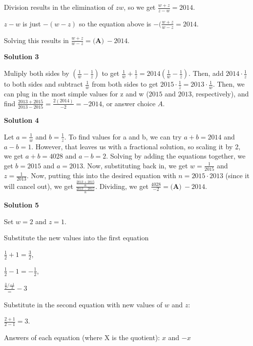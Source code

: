 \begin{enumerate}
 Division results in the elimination of $zw$, so we get $\frac{w+z}{z-w} = 2014$.

 $z-w$ is just $-(w-z)$ so the equation above is $-(\frac{w+z}{w-z} = 2014$.

 Solving this results in $\frac{w+z}{w-z} = \boxed{\textbf{(A)}\ -2014}$.

 



\textbf{Solution 3}

Muliply both sides by $\left(\frac{1}{w}-\frac{1}{z}\right)$ to get $\frac{1}{w}+\frac{1}{z}=2014\left(\frac{1}{w}-\frac{1}{z}\right)$. Then, add $2014\cdot\frac{1}{z}$ to both sides and subtract $\frac{1}{w}$ from both sides to get $2015\cdot\frac{1}{z}=2013\cdot\frac{1}{w}$. Then, we can plug in the most simple values for z and w ($2015$ and $2013$, respectively), and find $\frac{2013+2015}{2013-2015}=\frac{2(2014)}{-2}=-2014$, or answer choice $\boxed{A}$.

 



\textbf{Solution 4}

Let $a = \frac{1}{w}$ and $b = \frac{1}{z}$. To find values for a and b, we can try $a+b = 2014$ and $a-b=1$. However, that leaves us with a fractional solution, so scaling it by 2, we get $a+b = 4028$ and $a-b=2$. Solving by adding the equations together, we get $b = 2015$ and $a = 2013$. Now, substituting back in, we get $w = \frac{1}{2015}$ and $z = \frac{1}{2013}$. Now, putting this into the desired equation with $n = 2015 \cdot 2013$ (since it will cancel out), we get $\frac{\frac{2013+2015}{n}}{\frac{2013-2015}{n}}$. Dividing, we get $\frac{4028}{-2} = \boxed{\textbf{(A)}\ -2014}$.

 



\textbf{Solution 5}

Set \( w = 2 \) and \( z = 1 \).

 Substitute the new values into the first equation 

 $\frac{1}{2} + 1 = \frac{3}{2}$,

 $\frac{1}{2} - 1 = -\frac{1}{2}$,

 $\frac{\frac{3}{2} / \frac{-1}{2}} = -3$

 Substitute in the second equation with new values of \( w \) and \( z \):

 $\frac{2 + 1}{2 - 1} = 3.$

 Answers of each equation (where X is the quotient): $x$ and $-x$ 


\end{enumerate}
